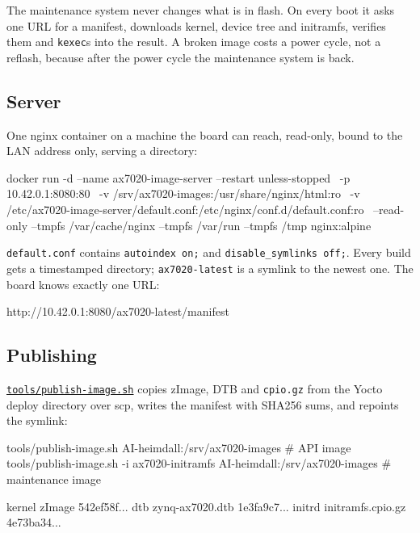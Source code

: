 \documentclass[11pt,a4paper,oneside]{article}
\newcommand{\file}[1]{{\color{bluemid}\nolinkurl{#1}}}
\newcommand{\cmd}[1]{\texttt{#1}}
\newcommand{\repo}{https://github.com/MaxClerkwell/ax7020-bringup}
\newcommand{\rfile}[1]{\href{\repo/blob/master/#1}{\color{bluemid}\nolinkurl{#1}}}
\begin{document}
The maintenance system never changes what is in flash. On every boot it asks
one URL for a manifest, downloads kernel, device tree and initramfs, verifies
them and \cmd{kexec}s into the result. A broken image costs a power cycle,
not a reflash, because after the power cycle the maintenance system is back.

\subsection{Server}

One nginx container on a machine the board can reach, read-only, bound to
the LAN address only, serving a directory:

\begin{shell}
docker run -d --name ax7020-image-server --restart unless-stopped \
  -p 10.42.0.1:8080:80 \
  -v /srv/ax7020-images:/usr/share/nginx/html:ro \
  -v /etc/ax7020-image-server/default.conf:/etc/nginx/conf.d/default.conf:ro \
  --read-only --tmpfs /var/cache/nginx --tmpfs /var/run --tmpfs /tmp nginx:alpine
\end{shell}

\file{default.conf} contains \cmd{autoindex on;} and \cmd{disable\_symlinks off;}.
Every build gets a timestamped directory; \file{ax7020-latest} is a symlink to
the newest one. The board knows exactly one URL:

\begin{code}
http://10.42.0.1:8080/ax7020-latest/manifest
\end{code}

\subsection{Publishing}

\rfile{tools/publish-image.sh} copies zImage, DTB and \cmd{cpio.gz} from the
Yocto deploy directory over scp, writes the manifest with SHA256 sums, and
repoints the symlink:

\begin{shell}
tools/publish-image.sh AI-heimdall:/srv/ax7020-images                  # API image
tools/publish-image.sh -i ax7020-initramfs AI-heimdall:/srv/ax7020-images   # maintenance image
\end{shell}

\begin{code}
kernel zImage             542ef58f...
dtb    zynq-ax7020.dtb    1e3fa9c7...
initrd initramfs.cpio.gz  4e73ba34...
\end{code}
\end{document}
